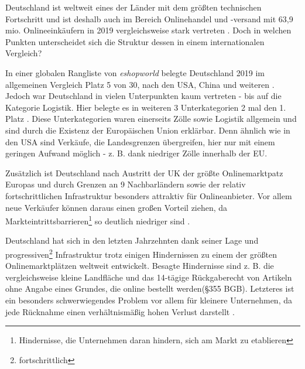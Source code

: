 \iffalse

    https://www.worldretailcongress.com/__media/Global_ecommerce_Market_Ranking_2019_001.pdf
    
     \cite{esworld} 

    name: globaler vergleich bezüglich des onlinehandels

\fi

Deutschland ist weltweit eines der Länder mit dem größten technischen Fortschritt und ist deshalb auch im Bereich Onlinehandel und -versand mit 63,9 mio. Onlineeinkäufern in 2019 vergleichsweise stark vertreten \cite[S. 8]{esworld}. Doch in welchen Punkten unterscheidet sich die Struktur dessen in einem internationalen Vergleich?

In einer globalen Rangliste von \emph{eshopworld} belegte Deutschland 2019 im allgemeinen Vergleich Platz 5 von 30, nach den USA, China und weiteren \cite[S. 3]{esworld}. Jedoch war Deutschland in vielen Unterpunkten kaum vertreten - bis auf die Kategorie Logistik. Hier belegte es in weiteren 3 Unterkategorien 2 mal den 1. Platz \cite[S. 10ff]{esworld}. Diese Unterkategorien waren einerseits Zölle sowie Logistik allgemein und sind durch die Existenz der Europäischen Union erklärbar. Denn ähnlich wie in den USA \cite[S. 4]{esworld} sind Verkäufe, die Landesgrenzen übergreifen, hier nur mit einem geringen Aufwand möglich - z. B. dank niedriger Zölle innerhalb der EU.%

Zusätzlich ist Deutschland nach Austritt der UK der größte Onlinemarktpatz Europas und durch Grenzen an 9 Nachbarländern sowie der relativ fortschrittlichen Infrastruktur besonders attraktiv für Onlineanbieter. Vor allem neue Verkäufer können daraus einen großen Vorteil ziehen, da Markteintrittsbarrieren\footnote{Hindernisse, die Unternehmen daran hindern, sich am Markt zu etablieren} so deutlich niedriger sind \cite[S. 8]{esworld}.

Deutschland hat sich in den letzten Jahrzehnten dank seiner Lage und progressiven\footnote{fortschrittlich} Infrastruktur trotz einigen Hindernissen zu einem der größten Onlinemarktplätzen weltweit entwickelt. Besagte Hindernisse sind z. B. die vergleichsweise kleine Landfläche und das 14-tägige Rückgaberecht von Artikeln ohne Angabe eines Grundes, die online bestellt werden(§355 BGB). Letzteres ist ein besonders schwerwiegendes Problem vor allem für kleinere Unternehmen, da jede Rücknahme einen verhältnismäßig hohen Verlust darstellt \cite{retourwahnsinn}.
